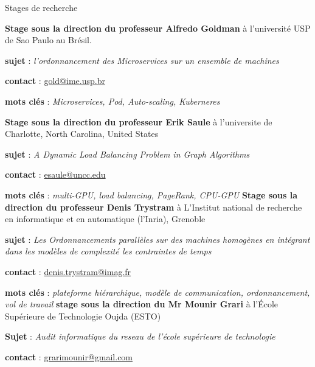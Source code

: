 \begin{rubric}{Stages de recherche}



     \textbf{Stage sous la direction du professeur Alfredo Goldman} à l'université USP de Sao Paulo au Brésil.
	\par \textbf{sujet} : \emph{l'ordonnancement des Microservices sur un ensemble de machines}
	\par \textbf{contact} : \href{mailto:gold@ime.usp.br}{gold@ime.usp.br}
	\par \textbf{mots clés} : \emph{Microservices, Pod, Auto-scaling, Kuberneres}
%

	\textbf{Stage sous la direction du professeur Erik Saule} à l’universite de Charlotte, North Carolina, United States
	\par \textbf{sujet} : \emph{A Dynamic Load Balancing Problem in Graph Algorithms}
	\par \textbf{contact} : \href{mailto:esaule@uncc.edu}{esaule@uncc.edu}
	\par \textbf{mots clés} : \emph{multi-GPU, load balancing, PageRank, CPU-GPU}
%
%
	\textbf{Stage sous la direction du professeur Denis Trystram} à L'Institut national de recherche en informatique et en automatique (l'Inria), Grenoble
	\par	\textbf{sujet} : \emph{Les Ordonnancements parallèles sur des machines homogènes en intégrant dans les modèles de complexité les contraintes de temps}
	\par \textbf{contact} :  \href{mailto:denis.trystram@imag.fr}{denis.trystram@imag.fr}
	\par \textbf{mots clés} : \emph{plateforme hiérarchique, modèle de communication, ordonnancement, vol de travail}
%
%
	\textbf{stage sous la direction du Mr Mounir Grari} à l’École Supérieure de Technologie Oujda (ESTO)
	\par	\textbf{Sujet} : \emph{Audit informatique du reseau de l'école supérieure de technologie}
	\par \textbf{contact} :  \href{mailto:grarimounir@gmail.com}{grarimounir@gmail.com}
\end{rubric}

